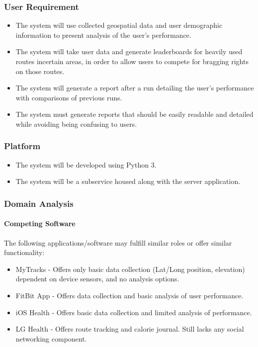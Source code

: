 \documentclass{article}
\begin{document}
\subsubsection{User Requirement}
\begin{itemize}
    \item The system will use collected geospatial data and user demographic information to present analysis of the user’s performance.
    \item The system will take user data and generate leaderboards for heavily used routes incertain areas, in order to allow users to compete for bragging rights on those routes.
    \item The system will generate a report after a run detailing the user’s performance with comparisons of previous runs.
    \item The system must generate reports that should be easily readable and detailed while avoiding being confusing to users.
\end{itemize}

\subsubsection{Platform}
\begin{itemize}
    \item The system will be developed using Python 3.
    \item The system will be a subservice housed along with the server application.
\end{itemize}

\subsubsection{Domain Analysis}
\paragraph{Competing Software}
The following applications/software may fulfill similar roles or offer similar functionality:
\begin{itemize}
    \item MyTracks - Offers only basic data collection (Lat/Long position, elevation) dependent on device sensors, and no analysis options.
    \item FitBit App - Offers data collection and basic analysis of user performance.
    \item iOS Health - Offers basic data collection and limited analysis of performance.
    \item LG Health - Offers route tracking and calorie journal. Still lacks any social networking component.
\end{itemize}
\end{document}
